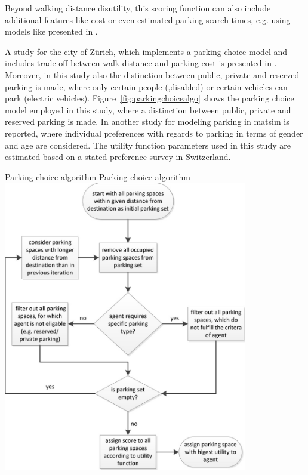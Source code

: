 Beyond walking distance disutility, this scoring function can also include additional features like cost or even estimated parking search times, e.g. using models like presented in \citet[][]{HorniEtAl_IATBRspec_2013}.

A study for the city of Zürich, which implements a parking choice model and includes trade-off between walk distance and parking cost is presented in \citet[][]{WaraichAxhausen_TRR_2012}. Moreover, in this study also the distinction between public, private and reserved parking is made, where only certain people (\eg ,disabled) or certain vehicles can park (\eg electric vehicles). Figure~\ref{fig:parkingchoicealgo} shows the parking choice model employed in this study, where a distinction between public, private and reserved parking is made. In \citet[][]{WaraichEtAl_unpub_TRB_2013} another study for modeling parking in \gls{matsim} is reported, where individual preferences with regards to parking in terms of gender and age are considered. The utility function parameters used in this study are estimated based on a stated preference survey in Switzerland.

\createfigure%
{Parking choice algorithm}%
{Parking choice algorithm}%
{\label{fig:parkingchoicealgo}}%
{\includegraphics[width=0.8\textwidth, angle=0]{extending/figures/Parking/parking_algo.png}}%
{\citet[][]{WaraichAxhausen_TRR_2012}}

